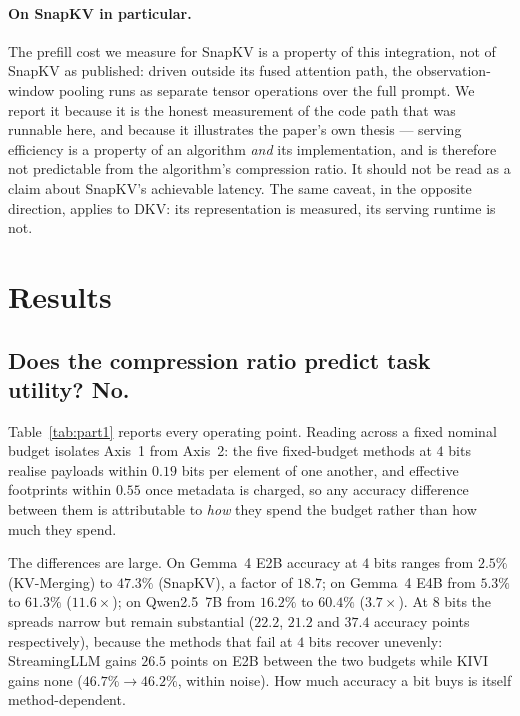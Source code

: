 \documentclass{article}
\theoremstyle{definition}
\begin{document}
\paragraph{On SnapKV in particular.} The prefill cost we measure for SnapKV is a property of this integration, not of SnapKV as published: driven outside its fused attention path, the observation-window pooling runs as separate tensor operations over the full prompt. We report it because it is the honest measurement of the code path that was runnable here, and because it illustrates the paper's own thesis --- serving efficiency is a property of an algorithm \emph{and} its implementation, and is therefore not predictable from the algorithm's compression ratio. It should not be read as a claim about SnapKV's achievable latency. The same caveat, in the opposite direction, applies to DKV: its representation is measured, its serving runtime is not.

\section{Results}
\label{sec:results}

\subsection{Does the compression ratio predict task utility? No.}
\label{sec:res_axis12}

Table~\ref{tab:part1} reports every operating point. Reading across a fixed nominal budget isolates Axis~1 from Axis~2: the five fixed-budget methods at $4$ bits realise payloads within $0.19$ bits per element of one another, and effective footprints within $0.55$ once metadata is charged, so any accuracy difference between them is attributable to \emph{how} they spend the budget rather than how much they spend.

The differences are large. On Gemma~4 E2B accuracy at $4$ bits ranges from $2.5\%$ (KV-Merging) to $47.3\%$ (SnapKV), a factor of $18.7$; on Gemma~4 E4B from $5.3\%$ to $61.3\%$ ($11.6\times$); on Qwen2.5~7B from $16.2\%$ to $60.4\%$ ($3.7\times$). At $8$ bits the spreads narrow but remain substantial ($22.2$, $21.2$ and $37.4$ accuracy points respectively), because the methods that fail at $4$ bits recover unevenly: StreamingLLM gains $26.5$ points on E2B between the two budgets while KIVI gains none ($46.7\% \to 46.2\%$, within noise). How much accuracy a bit buys is itself method-dependent.
\end{document}
